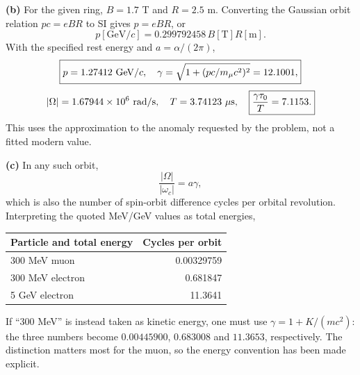 \medskip\noindent\textbf{(b)} For the given ring, $B=1.7$ T and $R=2.5$ m.  Converting the
Gaussian orbit relation $pc=eBR$ to SI gives $p=eBR$, or
\[
p[\mathrm{GeV}/c]=0.299792458\,B[\mathrm T]R[\mathrm m].
\]
With the specified rest energy and $a=\alpha/(2\pi)$,
\[
\boxed{p=1.27412\ {\rm GeV}/c,\quad
\gamma=\sqrt{1+(pc/m_\mu c^2)^2}=12.1001,}
\]
\[
|\Omega|=1.67944\times10^6\ {\rm rad/s},\quad
T=3.74123\ \mu{\rm s},\quad
\boxed{\frac{\gamma\tau_0}{T}=7.1153.}
\]
This uses the approximation to the anomaly requested by the problem,
not a fitted modern value.

\medskip\noindent\textbf{(c)} In any such orbit,
\[
\boxed{\frac{|\Omega|}{|\omega_c|}=a\gamma,}
\]
which is also the number of spin-orbit difference cycles per orbital
revolution.  Interpreting the quoted MeV/GeV values as total energies,
\begin{center}
\begin{tabular}{lr}
\toprule
Particle and total energy&Cycles per orbit\\
\midrule
300 MeV muon&0.00329759\\
300 MeV electron&0.681847\\
5 GeV electron&11.3641\\
\bottomrule
\end{tabular}
\end{center}
If ``300 MeV'' is instead taken as kinetic energy, one must use
$\gamma=1+K/(mc^2)$: the three numbers become
$0.00445900$, $0.683008$ and $11.3653$, respectively.
The distinction matters most for the muon, so the energy convention
has been made explicit.


